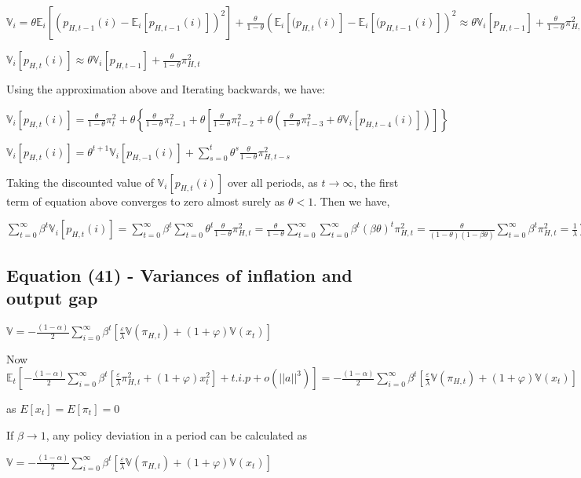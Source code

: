 \documentclass[
]{article}
\begin{document}
\(\displaystyle \mathbb{V}_i = \theta \mathbb{E}_i[(p_{H,t-1}(i)-\mathbb{E}_i[p_{H,t-1}(i)])^2] + \frac{\theta}{1-\theta}\left( \mathbb{E}_i[(p_{H,t}(i)]- \mathbb{E}_i[(p_{H,t-1}(i)]\right)^2 \approx \theta \mathbb{V}_i[p_{H,t-1}] + \frac{\theta}{1-\theta} \pi_{H,t}^2\)

\(\displaystyle \mathbb{V}_i[p_{H,t}(i)] \approx \theta \mathbb{V}_i[p_{H,t-1}] + \frac{\theta}{1-\theta} \pi_{H,t}^2\)

Using the approximation above and Iterating backwards, we have:

\(\displaystyle \mathbb{V}_i[p_{H,t}(i)]= \frac{\theta}{1-\theta} \pi_t^2+\theta \left\{\frac{\theta}{1-\theta} \pi_{t-1}^2+\theta \left[ \frac{\theta}{1-\theta} \pi_{t-2}^2+\theta \left( \frac{\theta}{1-\theta} \pi_{t-3}^2+\theta \mathbb{V}_i[p_{H,t-4}(i)] \right) \right] \right\}\)

\(\displaystyle \mathbb{V}_i[p_{H,t}(i)]= \theta^{t+1}\mathbb{V}_i[p_{H,-1}(i)]+ \sum_{s=0}^{t} \theta^s \frac{\theta}{1-\theta} \pi_{H,t-s}^2\)

Taking the discounted value of \(\mathbb{V}_i[p_{H,t}(i)]\) over all
periods, as \(t \to \infty\), the first term of equation above converges
to zero almost surely as \(\theta < 1\). Then we have,

\(\displaystyle \sum_{t=0}^{\infty} \beta^t \mathbb{V}_i[p_{H,t}(i)] = \sum_{t=0}^{\infty} \beta^t \sum_{t=0}^\infty\theta^t \frac{\theta}{1-\theta} \pi_{H,t}^2 = \frac{\theta}{1-\theta} \sum_{t=0}^{\infty} \sum_{t=0}^{\infty} \beta^{t} (\beta \theta)^t \pi_{H,t}^2 = \frac{\theta}{(1-\theta)(1-\beta \theta)}\sum_{t=0}^{\infty}\beta^t\pi_{H,t}^2 = \frac{1}{\lambda}\sum_{t=0}^{\infty}\beta^t\pi_{H,t}^2\)

\vspace{12pt}

\hypertarget{equation-41---variances-of-inflation-and-output-gap}{%
\subsection{Equation (41) - Variances of inflation and output
gap}\label{equation-41---variances-of-inflation-and-output-gap}}

\(\displaystyle \mathbb{V} = -\frac{(1-\alpha)}{2}\sum_{i=0}^{\infty} \beta^t \left[ \frac{\varepsilon}{\lambda}\mathbb{V}(\pi_{H,t})+ (1+\varphi)\mathbb{V}(x_t) \right]\)

\vspace{8pt}

Now
\(\displaystyle \mathbb{E}_t \left[ -\frac{(1-\alpha)}{2}\sum_{i=0}^{\infty} \beta^t \left[ \frac{\varepsilon}{\lambda}\pi_{H,t}^2+ (1+\varphi)x_t^2 \right] + t.i.p+ o(||a||^3) \right] = -\frac{(1-\alpha)}{2}\sum_{i=0}^{\infty} \beta^t \left[ \frac{\varepsilon}{\lambda}\mathbb{V}(\pi_{H,t})+ (1+\varphi)\mathbb{V}(x_t) \right]\)

as \(E[x_t]=E[\pi_t]=0\)

If \(\beta \to 1\), any policy deviation in a period can be calculated
as

\(\displaystyle \mathbb{V} = -\frac{(1-\alpha)}{2}\sum_{i=0}^{\infty} \beta^t \left[ \frac{\varepsilon}{\lambda}\mathbb{V}(\pi_{H,t})+ (1+\varphi)\mathbb{V}(x_t) \right]\)
\end{document}
